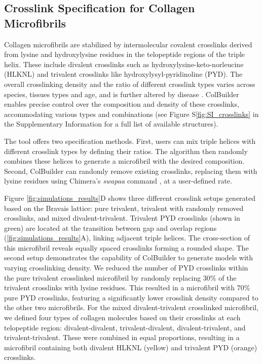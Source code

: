 \documentclass[10pt,letterpaper]{article}
\begin{document}
\subsection*{Crosslink Specification for Collagen Microfibrils}\label{subsec3}

Collagen microfibrils are stabilized by intermolecular covalent crosslinks derived from lysine and hydroxylysine residues in the telopeptide regions of the triple helix. These include divalent crosslinks such as hydroxylysine-keto-norleucine (HLKNL) and trivalent crosslinks like hydroxylysyl-pyridinoline (PYD). The overall crosslinking density and the ratio of different crosslink types varies across species, tissues types and age, and is further altered by disease \cite{snedeker2014therole}. ColBuilder enables precise control over the composition and density of these crosslinks, accommodating various types and combinations (see Figure S\ref{fig:SI_crosslinks} in the Supplementary Information for a full list of available structures).

The tool offers two specification methods. First, users can mix triple helices with different crosslink types by defining their ratios. The algorithm then randomly combines these helices to generate a microfibril with the desired composition. Second, ColBuilder can randomly remove existing crosslinks, replacing them with lysine residues using Chimera's \textit{swapaa} command \cite{pettersen2004chimera}, at a user-defined rate. 

Figure \ref{fig:simulations_results}D shows three different crosslink setups generated based on the Bravais lattice: pure trivalent, trivalent with randomly removed crosslinks, and mixed divalent-trivalent. Trivalent PYD crosslinks (shown in green) are located at the transition between gap and overlap regions (\ref{fig:simulations_results}A), linking adjacent triple helices. The cross-section of this microfibril reveals equally spaced crosslinks forming a rounded shape. The second setup demonstrates the  capability of ColBuilder to generate models with varying crosslinking density. We reduced the number of PYD crosslinks within the pure trivalent crosslinked microfibril by randomly replacing 30\% of the trivalent crosslinks with lysine residues. This resulted in a microfibril with 70\% pure PYD crosslinks, featuring a significantly lower crosslink density compared to the other two microfibrils. For the mixed divalent-trivalent crosslinked microfibril, we defined four types of collagen molecules based on their crosslinks at each telopeptide region: divalent-divalent, trivalent-divalent, divalent-trivalent, and trivalent-trivalent. These were combined in equal proportions, resulting in a microfibril containing both divalent HLKNL (yellow) and trivalent PYD (orange) crosslinks.
\end{document}

